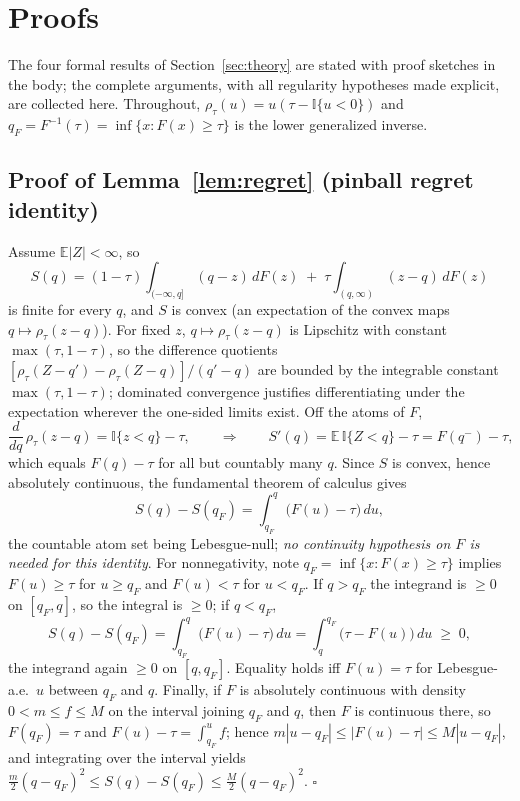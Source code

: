 \documentclass[11pt]{article}
\theoremstyle{remark}
\begin{document}
\section{Proofs}\label{app:proofs}

The four formal results of Section~\ref{sec:theory} are stated with
proof sketches in the body; the complete arguments, with all regularity
hypotheses made explicit, are collected here. Throughout, $\rho_\tau(u)
= u(\tau - \mathbb{I}\{u<0\})$ and $q_F = F^{-1}(\tau) = \inf\{x:F(x)\ge
\tau\}$ is the lower generalized inverse.

\subsection*{Proof of Lemma~\ref{lem:regret} (pinball regret identity)}

Assume $\mathbb{E}|Z|<\infty$, so
\[
S(q) = (1-\tau)\!\int_{(-\infty,q]}\!(q-z)\,dF(z)
\;+\; \tau\!\int_{(q,\infty)}\!(z-q)\,dF(z)
\]
is finite for every $q$, and $S$ is convex (an expectation of the
convex maps $q\mapsto\rho_\tau(z-q)$). For fixed $z$, $q\mapsto
\rho_\tau(z-q)$ is Lipschitz with constant $\max(\tau,1-\tau)$, so the
difference quotients $[\rho_\tau(Z-q')-\rho_\tau(Z-q)]/(q'-q)$ are
bounded by the integrable constant $\max(\tau,1-\tau)$; dominated
convergence justifies differentiating under the expectation wherever the
one-sided limits exist. Off the atoms of $F$,
\[
\frac{d}{dq}\,\rho_\tau(z-q) = \mathbb{I}\{z<q\}-\tau ,
\qquad\Longrightarrow\qquad
S'(q) = \mathbb{E}\,\mathbb{I}\{Z<q\}-\tau = F(q^-)-\tau,
\]
which equals $F(q)-\tau$ for all but countably many $q$. Since $S$ is
convex, hence absolutely continuous, the fundamental theorem of
calculus gives
\[
S(q)-S(q_F)=\int_{q_F}^{q}\big(F(u)-\tau\big)\,du,
\]
the countable atom set being Lebesgue-null; \emph{no continuity
hypothesis on $F$ is needed for this identity}. For nonnegativity,
note $q_F=\inf\{x:F(x)\ge\tau\}$ implies $F(u)\ge\tau$ for $u\ge q_F$
and $F(u)<\tau$ for $u<q_F$. If $q>q_F$ the integrand is $\ge0$ on
$[q_F,q]$, so the integral is $\ge0$; if $q<q_F$,
\[
S(q)-S(q_F)=\int_{q_F}^{q}\big(F(u)-\tau\big)\,du
=\int_{q}^{q_F}\big(\tau-F(u)\big)\,du\;\ge\;0 ,
\]
the integrand again $\ge0$ on $[q,q_F]$. Equality holds iff $F(u)=\tau$
for Lebesgue-a.e.\ $u$ between $q_F$ and $q$. Finally, if $F$ is
absolutely continuous with density $0<m\le f\le M$ on the interval
joining $q_F$ and $q$, then $F$ is continuous there, so $F(q_F)=\tau$
and $F(u)-\tau=\int_{q_F}^{u}f$; hence $m|u-q_F|\le|F(u)-\tau|\le
M|u-q_F|$, and integrating over the interval yields
$\tfrac{m}{2}(q-q_F)^2\le S(q)-S(q_F)\le\tfrac{M}{2}(q-q_F)^2$.
\hfill$\square$
\end{document}
